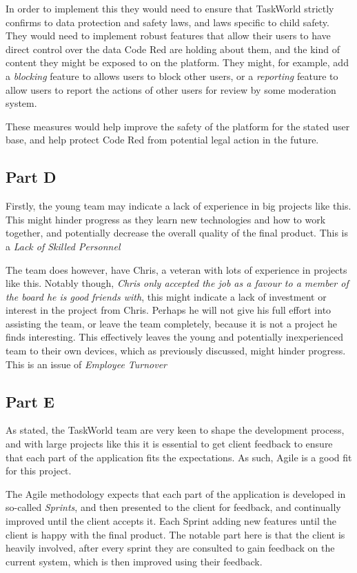 \documentclass[a4paper]{report}
\begin{document}
In order to implement this they would need to ensure that TaskWorld strictly confirms to
data protection and safety laws, and laws specific to child safety. They would need to implement
robust features that allow their users to have direct control over the data Code Red are holding
about them, and the kind of content they might be exposed to on the platform. They might, for example,
add a \textit{blocking} feature to allows users to block other users, or a \textit{reporting} feature
to allow users to report the actions of other users for review by some moderation system.

These measures would help improve the safety of the platform for the stated user base, and help protect
Code Red from potential legal action in the future.


\subsection{Part D}
Firstly, the young team may indicate a lack of experience in big projects like this. This might hinder
progress as they learn new technologies and how to work together, and potentially
decrease the overall quality of the final product. This is a \textit{Lack of Skilled Personnel}

The team does however, have Chris, a veteran with lots of experience in projects like this. Notably though,
\textit{Chris only accepted the job as a favour to a member of the board he is good friends with}, this might
indicate a lack of investment or interest in the project from Chris. Perhaps he will not give his full effort
into assisting the team, or leave the team completely, because it is not a project he finds interesting.
This effectively leaves the young and potentially inexperienced team to their own devices, which as previously 
discussed, might hinder progress. This is an issue of \textit{Employee Turnover}


\subsection{Part E}
As stated, the TaskWorld team are very keen to shape the development process, and with large projects like this
it is essential to get client feedback to ensure that each part of the application fits the expectations.
As such, Agile is a good fit for this project.

The Agile methodology expects that each part of the application is developed in so-called \textit{Sprints}, and
then presented to the client for feedback, and continually improved until the client accepts it. Each Sprint adding new
features until the client is happy with the final product. The notable part here is that the client is heavily involved,
after every sprint they are consulted to gain feedback on the current system, which is then improved using their feedback.
\end{document}
